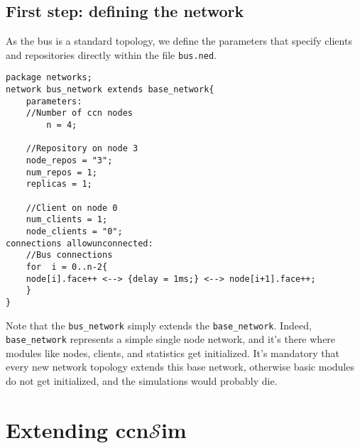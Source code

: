 \documentclass{article}
\newcommand{\ccnsim}{ccn$\mathcal{S}$im}
\begin{document}
\subsection{First step: defining the network}
As the bus is a standard topology, we define the parameters that specify clients and repositories directly within the file \verb|bus.ned|. 
\begin{Verbatim}[frame=single]
package networks;
network bus_network extends base_network{
    parameters:
	//Number of ccn nodes
    	n = 4; 

	//Repository on node 3
	node_repos = "3";
	num_repos = 1;
	replicas = 1;

	//Client on node 0
	num_clients = 1;
	node_clients = "0";
connections allowunconnected:
    //Bus connections
    for  i = 0..n-2{
	node[i].face++ <--> {delay = 1ms;} <--> node[i+1].face++;
    }
}
\end{Verbatim}
Note that the \verb|bus_network| simply extends the \verb|base_network|. Indeed, \verb|base_network| represents a simple single node network, and it's there where modules like nodes, clients, and statistics get initialized. It's mandatory that every new network topology extends this base network, otherwise basic modules do not get initialized, and the simulations would probably die. 
\section{Extending \ccnsim}


\end{document}
